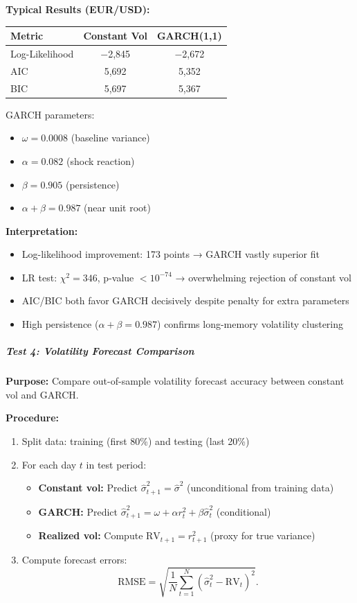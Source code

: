 \textbf{Typical Results (EUR/USD):}

\begin{center}
	\begin{tabular}{|l|c|c|}
		\hline
		\textbf{Metric} & \textbf{Constant Vol} & \textbf{GARCH(1,1)} \\
		\hline
		Log-Likelihood & $-$2,845 & $-$2,672 \\
		AIC & 5,692 & 5,352 \\
		BIC & 5,697 & 5,367 \\
		\hline
	\end{tabular}
\end{center}

GARCH parameters:
\begin{itemize}
	\item $\omega = 0.0008$ (baseline variance)
	\item $\alpha = 0.082$ (shock reaction)
	\item $\beta = 0.905$ (persistence)
	\item $\alpha + \beta = 0.987$ (near unit root)
\end{itemize}

\textbf{Interpretation:} 
\begin{itemize}
	\item Log-likelihood improvement: 173 points → GARCH vastly superior fit
	\item LR test: $\chi^2 = 346$, p-value $< 10^{-74}$ → overwhelming rejection of constant vol
	\item AIC/BIC both favor GARCH decisively despite penalty for extra parameters
	\item High persistence ($\alpha + \beta = 0.987$) confirms long-memory volatility clustering
\end{itemize}

\subparagraph{Test 4: Volatility Forecast Comparison}

\textbf{Purpose:} Compare out-of-sample volatility forecast accuracy between constant vol and GARCH.

\textbf{Procedure:}

\begin{enumerate}
	\item Split data: training (first 80\%) and testing (last 20\%)
	\item For each day $t$ in test period:
	\begin{itemize}
		\item \textbf{Constant vol:} Predict $\hat{\sigma}_{t+1}^2 = \hat{\sigma}^2$ (unconditional from training data)
		\item \textbf{GARCH:} Predict $\hat{\sigma}_{t+1}^2 = \omega + \alpha r_t^2 + \beta \hat{\sigma}_t^2$ (conditional)
		\item \textbf{Realized vol:} Compute $\text{RV}_{t+1} = r_{t+1}^2$ (proxy for true variance)
	\end{itemize}
	\item Compute forecast errors:
	\begin{equation}
		\text{RMSE} = \sqrt{\frac{1}{N} \sum_{t=1}^N (\hat{\sigma}_t^2 - \text{RV}_t)^2}.
	\end{equation}
\end{enumerate}

